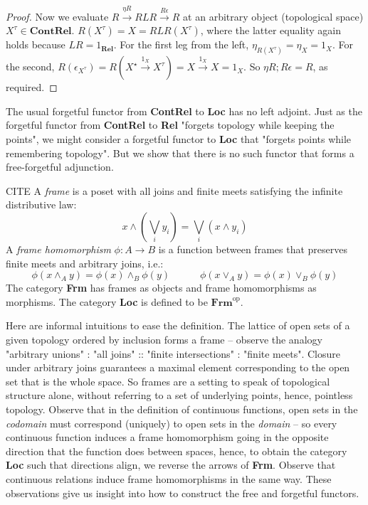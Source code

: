 \begin{marginfigure}
\begin{proposition}[$L \dashv R$]
\begin{proof}
Now we evaluate $R \overset{\eta R}{\rightarrow} RLR \overset{R \epsilon}{\rightarrow} R$ at an arbitrary object (topological space) $X^\tau \in \textbf{ContRel}$. $R(X^\tau) = X = RLR(X^\tau)$, where the latter equality again holds because $LR = 1_\textbf{Rel}$. For the first leg from the left, $\eta_{R(X^\tau)} = \eta_X = 1_{X}$. For the second, $R(\epsilon_{X^\tau}) = R(X^\star \overset{1_X}{\rightarrow} X^\tau) = X \overset{1_X}{\rightarrow} X = 1_X$. So $\eta R ; R \epsilon = R$, as required.
\end{proof}
\end{proposition}

The usual forgetful functor from \textbf{ContRel} to \textbf{Loc} has no left adjoint. Just as the forgetful functor from \textbf{ContRel} to \textbf{Rel} "forgets topology while keeping the points", we might consider a forgetful functor to \textbf{Loc} that "forgets points while remembering topology". But we show that there is no such functor that forms a free-forgetful adjunction.

\begin{rem}\bR CITE \e
A \emph{frame} is a poset with all joins and finite meets satisfying the infinite distributive law:
\[x \wedge (\bigvee\limits_{i}y_i) = \bigvee\limits_{i}(x \wedge y_i)\]
A \emph{frame homomorphism} $\phi: A \rightarrow B$ is a function between frames that preserves finite meets and arbitrary joins, i.e.:
\[\phi(x \wedge_A y) = \phi(x) \wedge_B \phi(y) \quad \quad \quad \phi(x \vee_A y) = \phi(x) \vee_B \phi(y)\]
The category \textbf{Frm} has frames as objects and frame homomorphisms as morphisms. The category \textbf{Loc} is defined to be $\textbf{Frm}^\text{op}$.
\end{rem}

\begin{remark}
Here are informal intuitions to ease the definition. The lattice of open sets of a given topology ordered by inclusion forms a frame -- observe the analogy "arbitrary unions" : "all joins" :: "finite intersections" : "finite meets". Closure under arbitrary joins guarantees a maximal element corresponding to the open set that is the whole space. So frames are a setting to speak of topological structure alone, without referring to a set of underlying points, hence, pointless topology. Observe that in the definition of continuous functions, open sets in the \emph{codomain} must correspond (uniquely) to open sets in the \emph{domain} -- so every continuous function induces a frame homomorphism going in the opposite direction that the function does between spaces, hence, to obtain the category \textbf{Loc} such that directions align, we reverse the arrows of \textbf{Frm}. Observe that continuous relations induce frame homomorphisms in the same way. These observations give us insight into how to construct the free and forgetful functors.
\end{remark}


\end{marginfigure}
